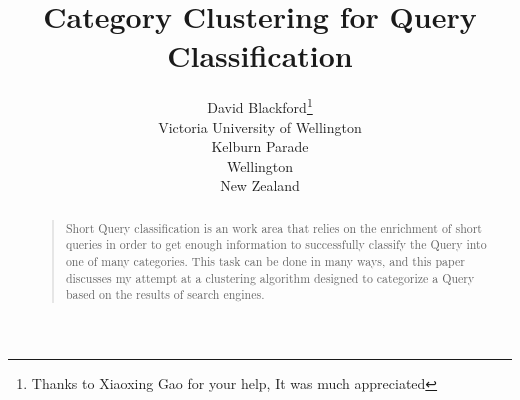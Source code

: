 \documentclass[letterpaper]{article}
\begin{document}
%
\title{Category Clustering for Query Classification}
\author{David Blackford\thanks{Thanks to Xiaoxing Gao for your help, It was much appreciated}\\
Victoria University of Wellington\\
Kelburn Parade\\
Wellington\\
New Zealand\\
}
\maketitle
\begin{abstract}
\begin{quote}
Short Query classification is an work area that relies on the enrichment of short queries in order to get enough information to successfully classify the Query into 
one of many categories. This task can be done in many ways, and this paper discusses my attempt at a clustering algorithm designed to categorize a Query based on the results of search engines.
\end{quote}
\end{abstract}
\end{document}

